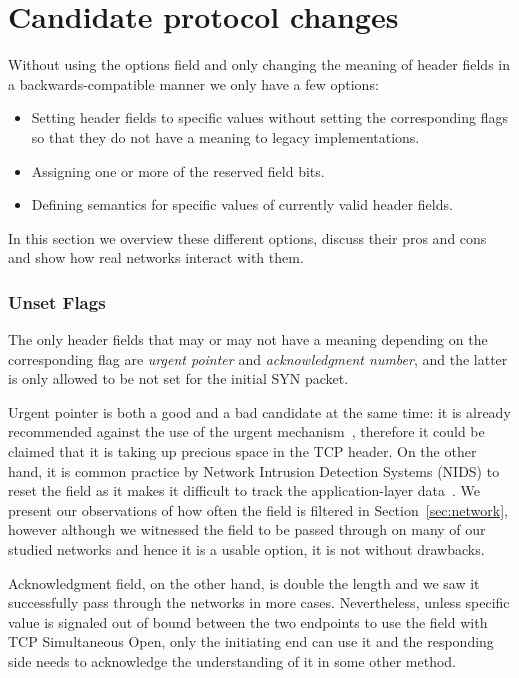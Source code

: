 \documentclass{sig-alternate-10pt}
\begin{document}
\section{Candidate protocol changes}
\label{sec:protocolChanges}

Without using the options field and only changing the meaning of header fields in a backwards-compatible manner we only have a few options:
\begin{itemize}
    \item Setting header fields to specific values without setting the corresponding flags so that they do not have a meaning to legacy implementations.
    \item Assigning one or more of the reserved field bits.
    \item Defining semantics for specific values of currently valid header fields.
\end{itemize}

In this section we overview these different options, discuss their pros and cons and show how real networks interact with them.

\subsubsection*{Unset Flags}
\label{sec:unset}

The only header fields that may or may not have a meaning depending on the corresponding flag are \emph{urgent pointer} and \emph{acknowledgment number}, and the latter is only allowed to be not set for the initial SYN packet.

Urgent pointer is both a good and a bad candidate at the same time: it is already recommended against the use of the urgent mechanism~\cite{Gont:2011vi}, therefore it could be claimed that it is taking up precious space in the TCP header. On the other hand, it is common practice by Network Intrusion Detection Systems (NIDS) to reset the field as it makes it difficult to track the application-layer data~\cite{seolma}. We present our observations of how often the field is filtered in Section~\ref{sec:network}, however although we witnessed the field to be passed through on many of our studied networks and hence it is a usable option, it is not without drawbacks.

Acknowledgment field, on the other hand, is double the length and we saw it successfully pass through the networks in more cases. Nevertheless, unless specific value is signaled out of bound between the two endpoints to use the field with TCP Simultaneous Open, only the initiating end can use it and the responding side needs to acknowledge the understanding of it in some other method. 
\end{document}
